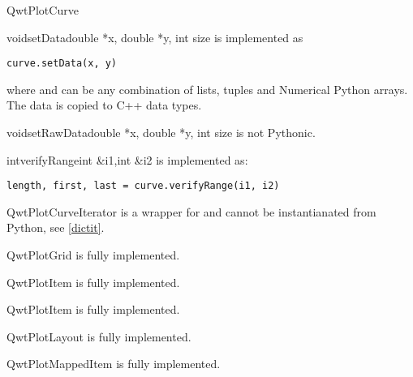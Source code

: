\documentclass{manual}
\begin{document}
\begin{classdesc*}{QwtPlotCurve}

  \begin{cfuncdesc}{void}{setData}{double *x, double *y, int size}
    is implemented as
    \begin{verbatim}
curve.setData(x, y)
    \end{verbatim}
    where  and  can be any combination of lists, tuples and
    Numerical Python arrays.  The data is copied to C++ data types.
  \end{cfuncdesc}

  \begin{cfuncdesc}{void}{setRawData}{double *x, double *y, int size}
      is not Pythonic.
  \end{cfuncdesc}

  \begin{cfuncdesc}{int}{verifyRange}{int \&i1,int \&i2}
    is implemented as:
    \begin{verbatim}
length, first, last = curve.verifyRange(i1, i2)
    \end{verbatim}
  \end{cfuncdesc}

\end{classdesc*}

\begin{classdesc*}{QwtPlotCurveIterator}
  is a wrapper for  and cannot be instantianated
  from Python, see \ref{dictit}.
\end{classdesc*}

\begin{classdesc*}{QwtPlotGrid}
  is fully implemented.
\end{classdesc*}

\begin{classdesc*}{QwtPlotItem}
  is fully implemented.
\end{classdesc*}

\begin{classdesc*}{QwtPlotItem}
  is fully implemented.
\end{classdesc*}

\begin{classdesc*}{QwtPlotLayout}
  is fully implemented.
\end{classdesc*}

\begin{classdesc*}{QwtPlotMappedItem}
  is fully implemented.
\end{classdesc*}
\end{document}
